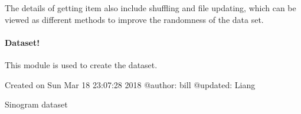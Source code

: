 \documentclass[letterpaper,10pt,english]{sphinxmanual}
\begin{document}
The details of getting item also include shuffling and file updating, which can be viewed as different methods to improve the randomness of the data set.


\paragraph{Dataset!}
\label{\detokenize{usage/datset_file:module-datasets}}\label{\detokenize{usage/datset_file:dataset}}\label{\detokenize{usage/datset_file::doc}}
This module is used to create the dataset.

Created on Sun Mar 18 23:07:28 2018
@author: bill
@updated: Liang

\begin{fulllineitems}
\label{\detokenize{usage/datset_file:datasets.Sino_Dataset}}
Sinogram dataset

\begin{fulllineitems}
\label{\detokenize{usage/datset_file:datasets.Sino_Dataset.checkfeature}}
\end{fulllineitems}


\begin{fulllineitems}
\label{\detokenize{usage/datset_file:datasets.Sino_Dataset.loadFile}}
\end{fulllineitems}


\begin{fulllineitems}
\label{\detokenize{usage/datset_file:datasets.Sino_Dataset.setMaxMissing}}
\end{fulllineitems}


\end{fulllineitems}
\end{document}
